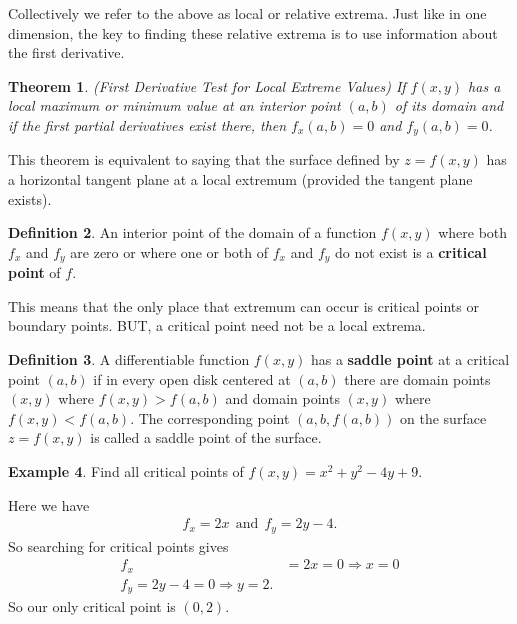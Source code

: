 \documentclass[12pt, letter]{article}
\theoremstyle{plain}
\newtheorem{theorem}{Theorem}
\numberwithin{theorem}{section}
\theoremstyle{definition}
\newtheorem{definition}[theorem]{Definition}
\newtheorem{example}[theorem]{Example}
\begin{document}
\bigskip

Collectively we refer to the above as local or relative extrema. Just like in one dimension, the key to finding these relative extrema is to use information about the first derivative.

\bigskip

\hrulefill

\bigskip

\begin{theorem}{(First Derivative Test for Local Extreme Values)}
If $f(x,y)$ has a local maximum or minimum value at an interior point $(a,b)$ of its domain and if the first partial derivatives exist there, then $f_x(a,b) = 0$ and $f_y(a,b)=0$.
\end{theorem}

\bigskip

This theorem is equivalent to saying that the surface defined by $z=f(x,y)$ has a horizontal tangent plane at a local extremum (provided the tangent plane exists).

\bigskip

\hrulefill

\bigskip

\begin{definition}
An interior point of the domain of a function $f(x,y)$ where both $f_x$ and $f_y$ are zero or where one or both of $f_x$ and $f_y$ do not exist is a \textbf{critical point} of $f$.
\end{definition}

\bigskip

\hrulefill

\bigskip

This means that the only place that extremum can occur is critical points or boundary points. BUT, a critical point need not be a local extrema.

\bigskip

\begin{definition}
A differentiable function $f(x,y)$ has a \textbf{saddle point} at a critical point $(a,b)$ if in every open disk centered at $(a,b)$ there are domain points $(x,y)$ where $f(x,y) > f(a,b)$ and domain points $(x,y)$ where $f(x,y) < f(a,b)$. The corresponding point $(a,b,f(a,b))$ on the surface $z=f(x,y)$ is called a saddle point of the surface.
\end{definition}

\bigskip

\hrulefill

\bigskip

\begin{example}
Find all critical points of $f(x,y) = x^2+y^2-4y+9$.

\smallskip

Here we have
\begin{align*}
f_x = 2x \ \ \text{and} \ \ f_y = 2y-4.
\end{align*}
So searching for critical points gives
\begin{align*}
f_x &= 2x = 0 \Rightarrow x=0\\
f_y = 2y-4 =0 \Rightarrow y=2.
\end{align*}
So our only critical point is $(0,2)$.
\end{example}
\end{document}
